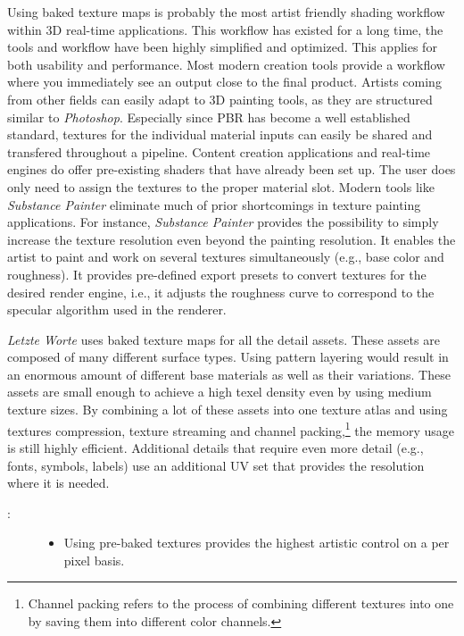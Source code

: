 \begin{description}
	Using baked texture maps is probably the most artist friendly shading workflow within 3D real-time applications. This workflow has existed for a long time, the tools and workflow have been highly simplified and optimized. This applies for both usability and performance. Most modern creation tools provide a workflow where you immediately see an output close to the final product. Artists coming from other fields can easily adapt to 3D painting tools, as they are structured similar to \emph{Photoshop}. Especially since PBR has become a well established standard, textures for the individual material inputs can easily be shared and transfered throughout a pipeline. Content creation applications and real-time engines do offer pre-existing shaders that have already been set up. The user does only need to assign the textures to the proper material slot. Modern tools like \emph{Substance Painter} eliminate much of prior shortcomings in texture painting applications. For instance, \emph{Substance Painter} provides the possibility to simply increase the texture resolution even beyond the painting resolution. It enables the artist to paint and work on several textures simultaneously (e.g., base color and roughness). It provides pre-defined export presets to convert textures for the desired render engine, i.e., it adjusts the roughness curve to correspond to the specular algorithm used in the renderer.
	\item[\patExamples:]%
	\emph{Letzte Worte} uses baked texture maps for all the detail assets. These assets are composed of many different surface types. Using pattern layering would result in an enormous amount of different base materials as well as their variations. These assets are small enough to achieve a high texel density even by using medium texture sizes. By combining a lot of these assets into one texture atlas and using textures compression, texture streaming and channel packing,\footnote{Channel packing refers to the process of combining different textures into one by saving them into different color channels.} the memory usage is still highly efficient. Additional details that require even more detail (e.g., fonts, symbols, labels) use an additional UV set that provides the resolution where it is needed.
	\item[\patConsequences:]\hfill 
		\begin{description}
			\item[\visual:]\hfill
			\begin{itemize}\mynobreakpar
				\item Using pre-baked textures provides the highest artistic control on a per pixel basis. 

\end{itemize}
\end{description}
\end{description}
